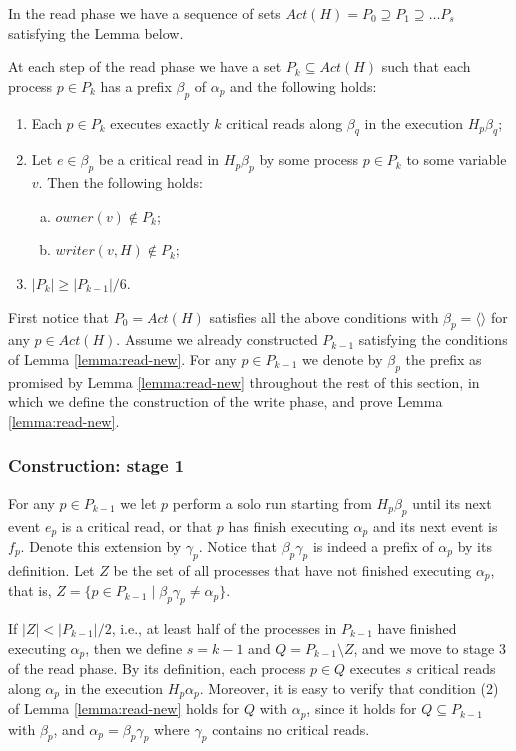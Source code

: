 In the read phase we have a sequence of sets $Act(H) = P_0 \supseteq P_1 \supseteq \ldots P_s$ satisfying the Lemma below.

\begin{lemma} \label{lemma:read-new}
	At each step of the read phase we have a set $P_k \subseteq Act(H)$ such that each process $p \in P_k$ has a prefix $\beta_p$ of $\alpha_p$ and the following holds:
	\begin{enumerate} [(1)]
		\item Each $p \in P_k$ executes exactly $k$ critical reads along $\beta_q$ in the execution $H_p \beta_q$;
		\item Let $e \in \beta_p$ be a critical read in $H_p \beta_p$ by some process $p \in P_k$ to some variable $v$. Then the following holds:
		\begin{enumerate}[(a)]
			\item $owner(v) \notin P_k$;
			\item $writer(v,H) \notin P_k$;
		\end{enumerate}
	\item $|P_k| \geq |P_{k-1}|/6$.
	\end{enumerate}
\end{lemma}

First notice that $P_0=Act(H)$ satisfies all the above conditions with $\beta_p=\langle \rangle$ for any $p \in Act(H)$. Assume we already constructed $P_{k-1}$ satisfying the conditions of Lemma \ref{lemma:read-new}. For any $p \in P_{k-1}$ we denote by $\beta_p$ the prefix as promised by Lemma \ref{lemma:read-new} throughout the rest of this section, in which we define the construction of the write phase, and prove Lemma \ref{lemma:read-new}.


\subsubsection{Construction: stage 1}
For any $p \in P_{k-1}$ we let $p$ perform a solo run starting from $H_p \beta_p$ until its next event $e_p$ is a critical read, or that $p$ has finish executing $\alpha_p$ and its next event is $f_p$. Denote this extension by $\gamma_p$. Notice that $\beta_p \gamma_p$ is indeed a prefix of $\alpha_p$ by its definition.
Let $Z$ be the set of all processes that have not finished executing $\alpha_p$, that is, $Z = \{p \in P_{k-1} \mid \beta_p \gamma_p \neq \alpha_p\}$.

If $|Z|<|P_{k-1}|/2$, i.e., at least half of the processes in $P_{k-1}$ have finished executing $\alpha_p$, then we define $s=k-1$ and $Q = P_{k-1} \setminus Z$, and we move to stage 3 of the read phase.
By its definition, each process $p \in Q$ executes $s$ critical reads along $\alpha_p$ in the execution $H_p \alpha_p$. Moreover, it is easy to verify that condition (2) of Lemma \ref{lemma:read-new} holds for $Q$ with $\alpha_p$, since it holds for $Q \subseteq P_{k-1}$ with $\beta_p$, and $\alpha_p = \beta_p \gamma_p$ where $\gamma_p$ contains no critical reads.

